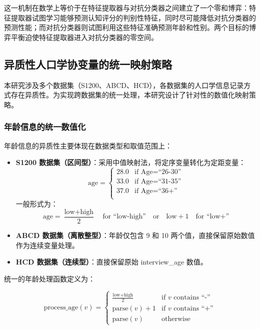这一机制在数学上等价于在特征提取器与对抗分类器之间建立了一个零和博弈：特征提取器试图学习能够预测认知评分的判别性特征，同时尽可能降低对抗分类器的预测性能；而对抗分类器则试图利用这些特征准确预测年龄和性别。两个目标的博弈平衡迫使特征提取器进入对抗分类器的零空间。

\subsection{异质性人口学协变量的统一映射策略}

本研究涉及多个数据集（S1200、ABCD、HCD），各数据集的人口学信息记录方式存在异质性。为实现跨数据集的统一处理，本研究设计了针对性的数值化映射策略。

\subsubsection{年龄信息的统一数值化}

年龄信息的异质性主要体现在数据类型和取值范围上：

\begin{itemize}
    \item \textbf{S1200 数据集（区间型）}：采用中值映射法，将定序变量转化为定距变量：
    \begin{equation}
    \text{age} = \begin{cases}
    28.0 & \text{if } \text{Age} = \text{``26-30''} \\
    33.0 & \text{if } \text{Age} = \text{``31-35''} \\
    37.0 & \text{if } \text{Age} = \text{``36+''} \\
    \end{cases}
    \end{equation}
    一般形式为：
    \begin{equation}
    \text{age} = \frac{\text{low} + \text{high}}{2} \quad \text{for } \text{``low-high''} \quad \text{or} \quad \text{low} + 1 \quad \text{for } \text{``low+''}
    \end{equation}

    \item \textbf{ABCD 数据集（离散整型）}：年龄仅包含 9 和 10 两个值，直接保留原始数值作为连续变量处理。

    \item \textbf{HCD 数据集（连续型）}：直接保留原始 interview\_age 数值。
\end{itemize}

统一的年龄处理函数定义为：

\begin{equation}
\text{process\_age}(v) = \begin{cases}
\frac{\text{low} + \text{high}}{2} & \text{if } v \text{ contains } \text{``-''} \\
\text{parse}(v) + 1 & \text{if } v \text{ contains } \text{``+''} \\
\text{parse}(v) & \text{otherwise}
\end{cases}
\end{equation}


